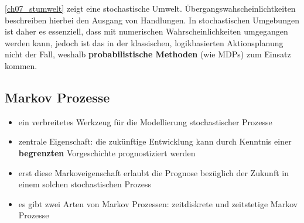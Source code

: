 \autoref{ch07_stumwelt} zeigt eine stochastische Umwelt.
\"Ubergangswahscheinlichtkeiten beschreiben hierbei den Ausgang von Handlungen.
In stochastischen Umgebungen ist daher es essenziell, dass mit numerischen Wahrscheinlichkeiten umgegangen werden kann, jedoch ist das in der klassischen, logikbasierten Aktionsplanung nicht der Fall, weshalb \textbf{probabilistische Methoden} (wie MDPs) zum Einsatz kommen.
\subsection{Markov Prozesse}
\begin{itemize}
\item ein verbreitetes Werkzeug f\"ur die Modellierung stochastischer Prozesse
\item zentrale Eigenschaft: die zuk\"unftige Entwicklung kann durch Kenntnis einer \textbf{begrenzten} Vorgeschichte prognostiziert werden
\item erst diese Markoveigenschaft erlaubt die Prognose bez\"uglich der Zukunft in einem solchen stochastischen Prozess
\item es gibt zwei Arten von Markov Prozessen: zeitdiskrete und zeitstetige Markov Prozesse
\end{itemize}

